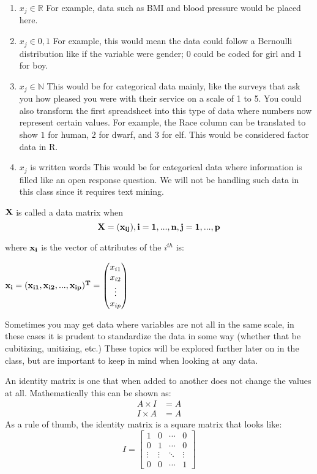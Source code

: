 \documentclass[a4paper]{article}
\begin{document}
  \begin{enumerate}
      \item $x_{j} \in \mathbb{R}$
      \newline \indent For example, data such as BMI and blood pressure would be placed here.

      \item $x_{j} \in {0,1}$
      \newline \indent For example, this would mean the data could follow a Bernoulli distribution like if the variable were gender; 0 could be coded for girl and 1 for boy. 

      \item $x_{j} \in \mathbb{N}$
      \newline \indent This would be for categorical data mainly, like the surveys that ask you how pleased you were with their service on a scale of 1 to 5. You could also transform the first spreadsheet into this type of data where numbers now represent certain values. For example, the Race column can be translated to show $1$ for human, $2$ for dwarf, and $3$ for elf. This would be considered factor data in R.

      \item $x_{j}$ is written words
      \newline \indent This would be for categorical data where information is filled like an open response question. We will not be handling such data in this class since it requires text mining.
  \end{enumerate}

    $\bf{X}$ is called a data matrix when $$\bf{X}=(\bf{x_{ij}}), i=1, ... , n , j=1, ... ,p$$

    where $\bf{x_i}$ is the vector of attributes of the $i^{th}$ is:

    $\bf{x_{i}}=(x_{i1}, x_{i2}, ... , x_{ip})^T= \begin{pmatrix}x_{i1}\\ x_{i2}\\\vdots\\x_{ip} \end{pmatrix}$

  Sometimes you may get data where variables are not all in the same scale, in these cases it is prudent to standardize the data in some way (whether that be cubitizing, unitizing, etc.) These topics will be explored further later on in the class, but are important to keep in mind when looking at any data.

An identity matrix is one that when added to another does not change the values at all. Mathematically this can be shown as:
	\begin{align*}
    A \times I &= A \\
    I \times A &= A
    \end{align*}
 As a rule of thumb, the identity matrix is a square matrix that looks like:    
       $$I =\begin{bmatrix}
     1 & 0 & \cdots & 0\\
     0 & 1 & \cdots  & 0\\
     \vdots & \vdots & \ddots & \vdots \\
     0 & 0 & \cdots &1
    \end{bmatrix}$$
    
\end{document}
